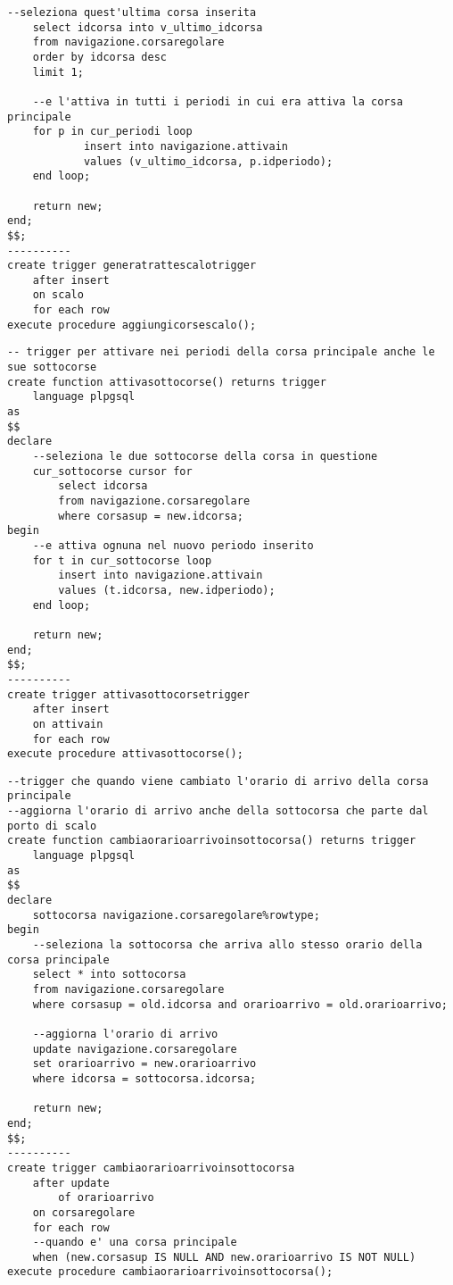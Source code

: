 \begin{lstlisting}[style = sqlstyle]
    --seleziona quest'ultima corsa inserita
    select idcorsa into v_ultimo_idcorsa
    from navigazione.corsaregolare
    order by idcorsa desc
    limit 1;

    --e l'attiva in tutti i periodi in cui era attiva la corsa principale
    for p in cur_periodi loop
            insert into navigazione.attivain
            values (v_ultimo_idcorsa, p.idperiodo);
    end loop;
    
    return new;
end;
$$;
----------
create trigger generatrattescalotrigger
    after insert
    on scalo
    for each row
execute procedure aggiungicorsescalo();
\end{lstlisting}

\begin{lstlisting}[style = sqlstyle]
-- trigger per attivare nei periodi della corsa principale anche le sue sottocorse
create function attivasottocorse() returns trigger
    language plpgsql
as
$$
declare
    --seleziona le due sottocorse della corsa in questione
    cur_sottocorse cursor for
        select idcorsa
        from navigazione.corsaregolare
        where corsasup = new.idcorsa;
begin
    --e attiva ognuna nel nuovo periodo inserito
    for t in cur_sottocorse loop
        insert into navigazione.attivain
        values (t.idcorsa, new.idperiodo);
    end loop;

    return new;
end;
$$;
----------
create trigger attivasottocorsetrigger
    after insert
    on attivain
    for each row
execute procedure attivasottocorse();
\end{lstlisting}

\begin{lstlisting}[style=sqlstyle]
--trigger che quando viene cambiato l'orario di arrivo della corsa principale
--aggiorna l'orario di arrivo anche della sottocorsa che parte dal porto di scalo
create function cambiaorarioarrivoinsottocorsa() returns trigger
    language plpgsql
as
$$
declare
    sottocorsa navigazione.corsaregolare%rowtype;
begin
    --seleziona la sottocorsa che arriva allo stesso orario della corsa principale
    select * into sottocorsa
    from navigazione.corsaregolare
    where corsasup = old.idcorsa and orarioarrivo = old.orarioarrivo;

    --aggiorna l'orario di arrivo
    update navigazione.corsaregolare
    set orarioarrivo = new.orarioarrivo
    where idcorsa = sottocorsa.idcorsa;

    return new;
end;
$$;
----------
create trigger cambiaorarioarrivoinsottocorsa
    after update
        of orarioarrivo
    on corsaregolare
    for each row
    --quando e' una corsa principale
    when (new.corsasup IS NULL AND new.orarioarrivo IS NOT NULL)
execute procedure cambiaorarioarrivoinsottocorsa();

\end{lstlisting}

